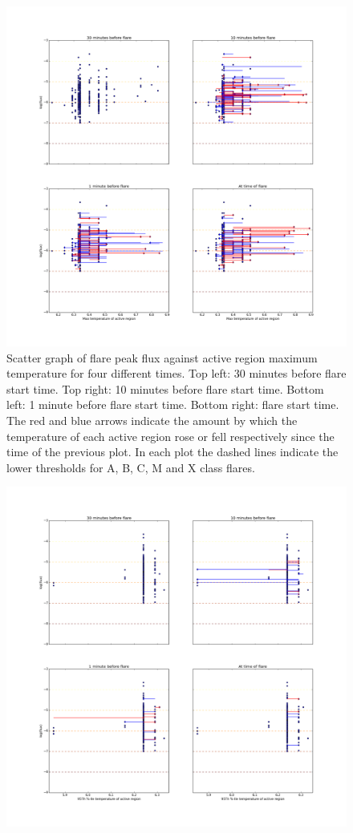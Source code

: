 \documentclass[referee,a4paper,12pt]{swsc}
\begin{document}
\begin{linenumbers}
\begin{figure}
	\centering
		\includegraphics[width=0.9\columnwidth]{tempplotsmax/allflares.png}
	\caption{Scatter graph of flare peak flux against active region maximum temperature for four different times. Top left: 30 minutes before flare start time. Top right: 10 minutes before flare start time. Bottom left: 1 minute before flare start time. Bottom right: flare start time. The red and blue arrows indicate the amount by which the temperature of each active region rose or fell respectively since the time of the previous plot. In each plot the dashed lines indicate the lower thresholds for A, B, C, M and X class flares.}
	\label{fig:allflares_max}
\end{figure}
\begin{figure}
	\centering
		\includegraphics[width=0.9\columnwidth]{tempplots_p95/allflares.png}

\end{figure}
\end{linenumbers}
\end{document}
